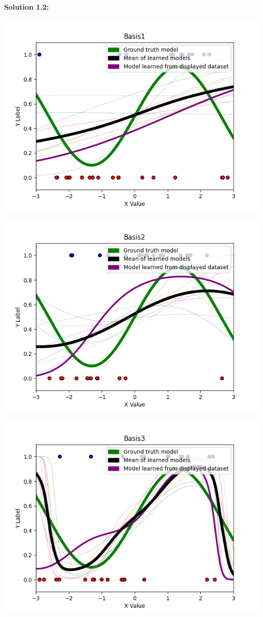 \documentclass[submit]{harvardml}
\begin{document}
\noindent\textbf{Solution 1.2:}\\
\begin{center}
    \includegraphics[scale=0.7]{Basis1.png}
\end{center}
\begin{center}
    \includegraphics[scale=0.7]{Basis2.png}
\end{center}
\begin{center}
    \includegraphics[scale=0.7]{Basis3.png}
\end{center}
\end{document}
